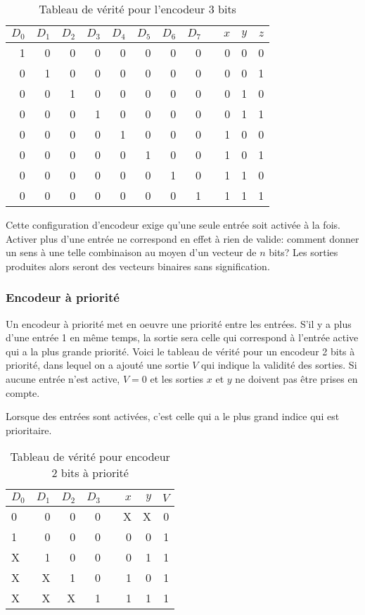\documentclass[11pt]{article}
\begin{document}
\begin{table}[htbp]
\caption{\label{tab:org62b3b5e}Tableau de vérité pour l'encodeur 3 bits}
\centering
\begin{tabular}{rrrrrrrrlrrr}
\(D_0\) & \(D_1\) & \(D_2\) & \(D_3\) & \(D_4\) & \(D_5\) & \(D_6\) & \(D_7\) &  & \(x\) & \(y\) & \(z\)\\[0pt]
\hline
1 & 0 & 0 & 0 & 0 & 0 & 0 & 0 &  & 0 & 0 & 0\\[0pt]
0 & 1 & 0 & 0 & 0 & 0 & 0 & 0 &  & 0 & 0 & 1\\[0pt]
0 & 0 & 1 & 0 & 0 & 0 & 0 & 0 &  & 0 & 1 & 0\\[0pt]
0 & 0 & 0 & 1 & 0 & 0 & 0 & 0 &  & 0 & 1 & 1\\[0pt]
0 & 0 & 0 & 0 & 1 & 0 & 0 & 0 &  & 1 & 0 & 0\\[0pt]
0 & 0 & 0 & 0 & 0 & 1 & 0 & 0 &  & 1 & 0 & 1\\[0pt]
0 & 0 & 0 & 0 & 0 & 0 & 1 & 0 &  & 1 & 1 & 0\\[0pt]
0 & 0 & 0 & 0 & 0 & 0 & 0 & 1 &  & 1 & 1 & 1\\[0pt]
\end{tabular}
\end{table}

Cette configuration d'encodeur exige qu'une seule entrée soit
activée à la fois. Activer plus d'une entrée ne correspond en effet à
rien de valide: comment donner un sens à une telle combinaison au
moyen d'un vecteur de \(n\) bits? Les sorties produites alors seront
des vecteurs binaires sans signification.

\subsubsection{Encodeur à priorité}
\label{sec:orga37a240}

Un encodeur à priorité met en oeuvre une priorité entre les
entrées. S'il y a plus d'une entrée 1 en même temps, la sortie sera
celle qui correspond à l'entrée active qui a la plus grande
priorité. Voici le tableau de vérité pour un encodeur 2 bits à priorité,
dans lequel on a ajouté une sortie \(V\) qui indique la validité des
sorties. Si aucune entrée n'est active, \(V=0\) et les sorties \(x\)
et \(y\) ne doivent pas être prises en compte.

Lorsque des entrées sont activées, c'est celle qui a le plus grand
indice qui est prioritaire.

\begin{table}[htbp]
\caption{\label{tab:org31bb329}Tableau de vérité pour encodeur 2 bits à priorité}
\centering
\begin{tabular}{lrrrlrrr}
\(D_0\) & \(D_1\) & \(D_2\) & \(D_3\) &  & \(x\) & \(y\) & \(V\)\\[0pt]
\hline
0 & 0 & 0 & 0 &  & X & X & 0\\[0pt]
1 & 0 & 0 & 0 &  & 0 & 0 & 1\\[0pt]
X & 1 & 0 & 0 &  & 0 & 1 & 1\\[0pt]
X & X & 1 & 0 &  & 1 & 0 & 1\\[0pt]
X & X & X & 1 &  & 1 & 1 & 1\\[0pt]
\end{tabular}
\end{table}
\end{document}
